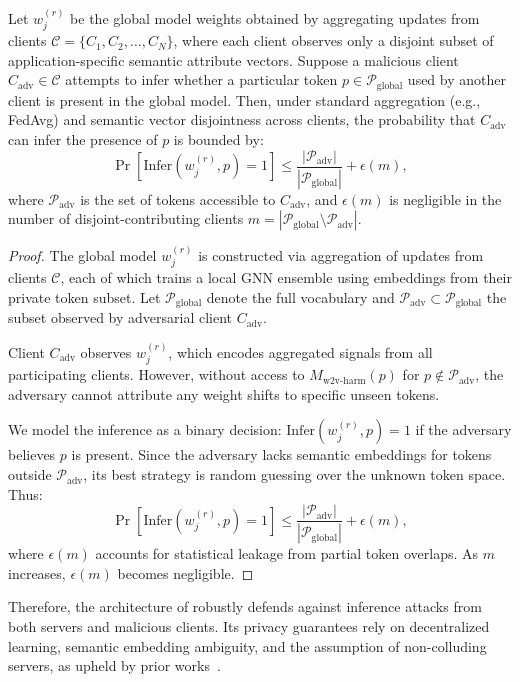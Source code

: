 \begin{theorem}
Let \(w_j^{(r)}\) be the global model weights obtained by aggregating updates from clients \(\mathcal{C} = \{C_1, C_2, \ldots, C_N\}\), where each client observes only a disjoint subset of application-specific semantic attribute vectors. Suppose a malicious client \(C_{\text{adv}} \in \mathcal{C}\) attempts to infer whether a particular token \(p \in \mathcal{P}_{\text{global}}\) used by another client is present in the global model. Then, under standard aggregation (e.g., FedAvg) and semantic vector disjointness across clients, the probability that \(C_{\text{adv}}\) can infer the presence of \(p\) is bounded by:
\[
\Pr[\text{Infer}(w_j^{(r)}, p) = 1] \leq \frac{|\mathcal{P}_{\text{adv}}|}{|\mathcal{P}_{\text{global}}|} + \epsilon(m),
\]
where \(\mathcal{P}_{\text{adv}}\) is the set of tokens accessible to \(C_{\text{adv}}\), and \(\epsilon(m)\) is negligible in the number of disjoint-contributing clients \(m = |\mathcal{P}_{\text{global}} \setminus \mathcal{P}_{\text{adv}}|\).
\end{theorem}

\begin{proof}
The global model \(w_j^{(r)}\) is constructed via aggregation of updates from clients \(\mathcal{C}\), each of which trains a local GNN ensemble using embeddings from their private token subset. Let \(\mathcal{P}_{\text{global}}\) denote the full vocabulary and \(\mathcal{P}_{\text{adv}} \subset \mathcal{P}_{\text{global}}\) the subset observed by adversarial client \(C_{\text{adv}}\).

Client \(C_{\text{adv}}\) observes \(w_j^{(r)}\), which encodes aggregated signals from all participating clients. However, without access to \(M_{\text{w2v-harm}}(p)\) for \(p \notin \mathcal{P}_{\text{adv}}\), the adversary cannot attribute any weight shifts to specific unseen tokens.

We model the inference as a binary decision: \(\text{Infer}(w_j^{(r)}, p) = 1\) if the adversary believes \(p\) is present. Since the adversary lacks semantic embeddings for tokens outside \(\mathcal{P}_{\text{adv}}\), its best strategy is random guessing over the unknown token space. Thus:
\[
\Pr[\text{Infer}(w_j^{(r)}, p) = 1] \leq \frac{|\mathcal{P}_{\text{adv}}|}{|\mathcal{P}_{\text{global}}|} + \epsilon(m),
\]
where \(\epsilon(m)\) accounts for statistical leakage from partial token overlaps. As \(m\) increases, \(\epsilon(m)\) becomes negligible.

\end{proof}

Therefore, the architecture of \Sys robustly defends against inference attacks from both servers and malicious clients. Its privacy guarantees rely on decentralized learning, semantic embedding ambiguity, and the assumption of non-colluding servers, as upheld by prior works~\cite{roy2020crypte,wu2022federated}.

